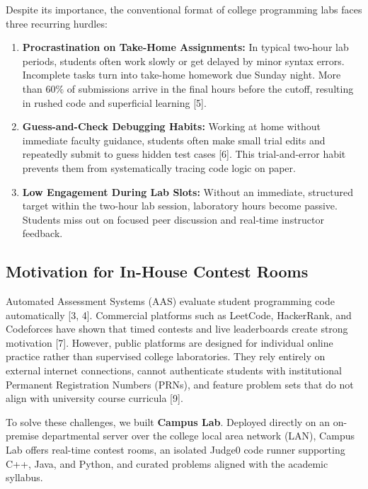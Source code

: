 \documentclass[12pt,a4paper]{article}
\begin{document}
Despite its importance, the conventional format of college programming labs faces three recurring hurdles:
\begin{enumerate}[leftmargin=1.5em, itemsep=1pt]
    \item \textbf{Procrastination on Take-Home Assignments:} In typical two-hour lab periods, students often work slowly or get delayed by minor syntax errors. Incomplete tasks turn into take-home homework due Sunday night. More than $60\%$ of submissions arrive in the final hours before the cutoff, resulting in rushed code and superficial learning [5].
    \item \textbf{Guess-and-Check Debugging Habits:} Working at home without immediate faculty guidance, students often make small trial edits and repeatedly submit to guess hidden test cases [6]. This trial-and-error habit prevents them from systematically tracing code logic on paper.
    \item \textbf{Low Engagement During Lab Slots:} Without an immediate, structured target within the two-hour lab session, laboratory hours become passive. Students miss out on focused peer discussion and real-time instructor feedback.
\end{enumerate}

\subsection{Motivation for In-House Contest Rooms}
Automated Assessment Systems (AAS) evaluate student programming code automatically [3, 4]. Commercial platforms such as LeetCode, HackerRank, and Codeforces have shown that timed contests and live leaderboards create strong motivation [7]. However, public platforms are designed for individual online practice rather than supervised college laboratories. They rely entirely on external internet connections, cannot authenticate students with institutional Permanent Registration Numbers (PRNs), and feature problem sets that do not align with university course curricula [9].

To solve these challenges, we built \textbf{Campus Lab}. Deployed directly on an on-premise departmental server over the college local area network (LAN), Campus Lab offers real-time contest rooms, an isolated Judge0 code runner supporting C++, Java, and Python, and curated problems aligned with the academic syllabus.
\end{document}
